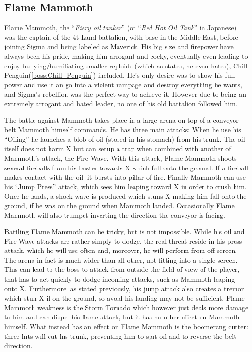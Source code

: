 \subsection{Flame Mammoth}\label{boss:Flame_mammoth}
Flame Mammoth, the ``\textit{Fiery oil tanker}'' (or ``\textit{Red Hot Oil Tank}'' in Japanese) was the captain of the 4t Land battalion, with base in the Middle East, before joining Sigma and being labeled as Maverick. His big size and firepower have always been his pride, making him arrogant and cocky, eventually even leading to enjoy bullying/humiliating smaller reploids (which as \cite{wayback:X_resources} states, he even hates), Chill Penguin(\ref{boss:Chill_Penguin})\cite{wiki:Flame_mammoth} included. He's only desire was to show his full power and use it an go into a violent rampage and destroy everything he wants, and Sigma's rebellion was the perfect way to achieve it. However due to being an extremely arrogant and hated leader, no one of his old battalion followed him\cite{MHX:manual}.

The battle against Mammoth takes place in a large arena on top of a conveyor belt Mammoth himself commands. He has three main attacks: When he use his ``Oiling'' he launches a blob of oil (stored in his stomach\cite{wayback:X_resources}) from his trunk.%
The oil itself does not harm X but can setup a trap when combined with another of Mammoth's attack, the Fire Wave. With this attack, Flame Mammoth shoots several fireballs from his buster towards X which fall onto the ground. If a fireball makes contact with the oil, it bursts into pillar of fire. Finally Mammoth can use his ``Jump Press'' attack, which sees him leaping toward X in order to crush him. Once he lands, a shock-wave is produced which stuns X making him fall onto the ground, if he was on the ground when Mammoth landed. Occasionally Flame Mammoth will also trumpet inverting the direction the conveyor is facing. 

Battling Flame Mammoth can be tricky, but is not impossible. While his oil and Fire Wave attacks are rather simply to dodge, the real threat reside in his press attack, which he will use often and, moreover, he will perform from off-screen. The arena in fact is much wider than all other, not fitting into a single screen. This can lead to the boss to attack from outside the field of view of the player, that has  to act quickly to dodge incoming attacks, such as Mammoth leaping onto X. Furthermore, as stated previously, his jump attack also creates a tremor which stun X if on the ground, so avoid his landing may not be sufficient. Flame Mammoth weakness is the Storm Tornado which however just deals more damage to him and can dispel his flame attack, but it has no other effect on Mammoth himself. What instead has an effect on Flame Mammoth is the boomerang cutter: three hits will cut his trunk, preventing him to spit oil and to reverse the belt direction.

